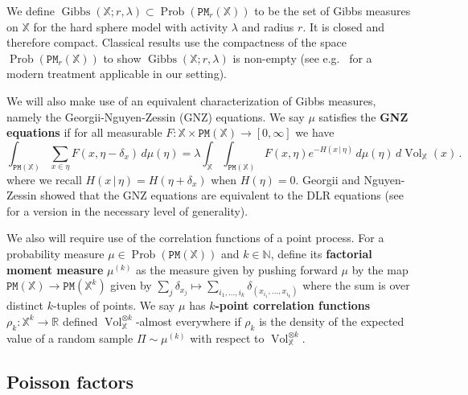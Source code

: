\documentclass[11pt]{amsart}
\theoremstyle{definition}
\theoremstyle{remark}
\newcommand{\R}{\mathbb{R}}
\newcommand{\bX}{\mathbb{X}}
\newcommand{\cP}{\mathtt{PM}}
\newcommand{\Prob}{\operatorname{Prob}}
\newcommand{\Vol}{\operatorname{Vol}}
\newcommand{\Gibbs}{\operatorname{Gibbs}}
\begin{document}
We define $\Gibbs(\bX;r,\lambda) \subset \Prob(\cP_r(\bX))$ to be the set of Gibbs measures on $\bX$ for the hard sphere model with activity $\lambda$ and radius $r$. It is closed and therefore compact.  Classical results use the compactness of the space $\Prob(\cP_r(\bX))$  to show  $\Gibbs(\bX;r,\lambda)$ is non-empty (see e.g.\ \cite[Theorem 5.6]{jansen2018gibbsian} for a modern treatment applicable in our setting). 

We will also make use of an equivalent characterization of Gibbs measures, namely the Georgii-Nguyen-Zessin (GNZ) equations.  We say $\mu$ satisfies the \textbf{GNZ equations} if for all measurable $F:\bX \times \cP(\bX) \to [0,\infty]$ we have 
\begin{equation} \label{eq:GNZ-equations}
    \int_{\cP(\bX)} \sum_{x \in \eta}F(x,\eta - \delta_x) \,d\mu(\eta) = \lambda \int_{\bX} \int_{\cP(\bX)} F(x,\eta) e^{-H(x\,|\,\eta)} \,d\mu(\eta)\,d\Vol_\bX(x)\,.
\end{equation}
where we recall $H(x\,|\,\eta) = H(\eta + \delta_x)$ when $H(\eta) = 0$.
Georgii \cite{georgii1976canonical} and Nguyen-Zessin \cite{nguyen1979integral} showed that the GNZ equations are equivalent to the DLR equations (see \cite[Theorem 5.10]{jansen2018gibbsian} for a version in the necessary level of generality). 

We also will require use of the correlation functions of a point process.  
For a probability measure $\mu \in \Prob(\cP(\bX))$ and $k \in \mathbb{N}$, define its \textbf{factorial moment measure} $\mu^{(k)}$ as the  measure given by pushing forward $\mu$ by the map $\cP(\bX) \to \cP(\bX^k)$ given by $\sum_{j} \delta_{x_j} \mapsto \sum_{i_1,\ldots,i_k} \delta_{(x_{i_1},\ldots,x_{i_k})}$ where the sum is over distinct $k$-tuples of points. We say $\mu$ has \textbf{$k$-point correlation functions} $\rho_k:\bX^k \to \R$ defined $\Vol_\bX^{\otimes k}$-almost everywhere if $\rho_k$ is the density of the expected value of a random sample $\Pi \sim \mu^{(k)}$ with respect to $\Vol_\bX^{\otimes k}$.  





\subsection{Poisson factors} \label{sec:Poisson-factors}
\end{document}
